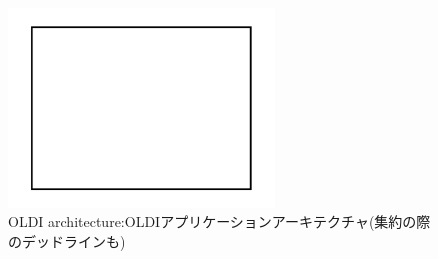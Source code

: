 \begin{figure}[t]
    \begin{center}
    \includegraphics[autoebb, width=200pt]{./img/test.pdf}
    \caption{OLDI architecture:OLDIアプリケーションアーキテクチャ(集約の際のデッドラインも)}
    \label{fig:oldi_tree}
    \end{center}
\end{figure}